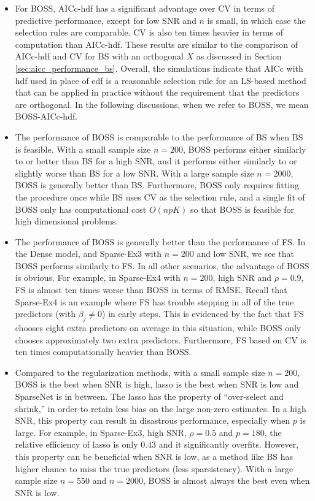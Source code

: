 \begin{itemize}
	\item For BOSS, AICc-hdf has a significant advantage over CV in terms of predictive performance, except for low SNR and $n$ is small, in which case the selection rules are comparable. CV is also ten times heavier in terms of computation than AICc-hdf. These results are similar to the comparison of AICc-hdf and CV for BS with an orthogonal $X$ as discussed in Section \ref{sec:aicc_performance_bs}. Overall, the simulations indicate that AICc with hdf used in place of edf is a reasonable selection rule for an LS-based method that can be applied in practice without the requirement that the predictors are orthogonal. In the following discussions, when we refer to BOSS, we mean BOSS-AICc-hdf. 

	\item The performance of BOSS is comparable to the performance of BS when BS is feasible. With a small sample size $n=200$, BOSS performs either similarly to or better than BS for a high SNR, and it performs either similarly to or slightly worse than BS for a low SNR. With a large sample size $n=2000$, BOSS is generally better than BS. Furthermore, BOSS only requires fitting the procedure once while BS uses CV as the selection rule, and a single fit of BOSS only has computational cost $O(npK)$ so that BOSS is feasible for high dimensional problems.

	\item The performance of BOSS is generally better than the performance of FS. In the Dense model, and Sparse-Ex3 with $n=200$ and low SNR, we see that BOSS performs similarly to FS. In all other scenarios, the advantage of BOSS is obvious. For example, in Sparse-Ex4 with $n=200$, high SNR and $\rho=0.9$, FS is almost ten times worse than BOSS in terms of RMSE. Recall that Sparse-Ex4 is an example where FS has trouble stepping in all of the true predictors (with $\beta_j \ne 0$) in early steps. This is evidenced by the fact that FS chooses eight extra predictors on average in this situation, while BOSS only chooses approximately two extra predictors. Furthermore, FS based on CV is ten times computationally heavier than BOSS. 

	\item Compared to the regularization methods, with a small sample size $n=200$, BOSS is the best when SNR is high, lasso is the best when SNR is low and SparseNet is in between. The lasso has the property of ``over-select and shrink,'' in order to retain less bias on the large non-zero estimates. In a high SNR, this property can result in disastrous performance, especially when $p$ is large. For example, in Sparse-Ex3, high SNR, $\rho=0.5$ and $p=180$, the relative efficiency of lasso is only $0.43$ and it significantly overfits. However, this property can be beneficial when SNR is low, as a method like BS has higher chance to miss the true predictors (less sparsistency). With a large sample size $n=550$ and $n=2000$, BOSS is almost always the best even when SNR is low. 


\end{itemize}
